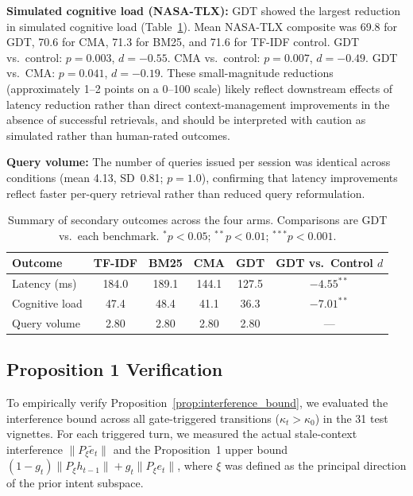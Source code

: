 \documentclass[11pt]{article}
\begin{document}
\textbf{Simulated cognitive load (NASA-TLX):} GDT showed the largest reduction in simulated cognitive load (Table~\ref{tab:secondary}). Mean NASA-TLX composite was 69.8 for GDT, 70.6 for CMA, 71.3 for BM25, and 71.6 for TF-IDF control. GDT vs.\ control: $p = 0.003$, $d = -0.55$. CMA vs.\ control: $p = 0.007$, $d = -0.49$. GDT vs.\ CMA: $p = 0.041$, $d = -0.19$. These small-magnitude reductions (approximately 1--2 points on a 0--100 scale) likely reflect downstream effects of latency reduction rather than direct context-management improvements in the absence of successful retrievals, and should be interpreted with caution as simulated rather than human-rated outcomes.

\textbf{Query volume:} The number of queries issued per session was identical across conditions (mean 4.13, SD~0.81; $p = 1.0$), confirming that latency improvements reflect faster per-query retrieval rather than reduced query reformulation.

\begin{table}[htbp]
\centering
\caption{Summary of secondary outcomes across the four arms. Comparisons are GDT vs.\ each benchmark. $^*p<0.05$; $^{**}p<0.01$; $^{***}p<0.001$.}
\label{tab:secondary}
\begin{tabular}{lccccc}
\toprule
\textbf{Outcome} & \textbf{TF-IDF} & \textbf{BM25} & \textbf{CMA} & \textbf{GDT} & \textbf{GDT vs.\ Control $d$} \\
\midrule
Latency (ms)      & 184.0           & 189.1         & 144.1        & 127.5        & $-4.55^{**}$ \\
Cognitive load    & 47.4            & 48.4          & 41.1         & 36.3         & $-7.01^{**}$ \\
Query volume      & 2.80            & 2.80          & 2.80         & 2.80         & --- \\
\bottomrule
\end{tabular}
\end{table}

\subsection{Proposition 1 Verification}
\label{sec:results_proposition}

To empirically verify Proposition~\ref{prop:interference_bound}, we evaluated the interference bound across all gate-triggered transitions ($\kappa_t > \kappa_0$) in the 31 test vignettes. For each triggered turn, we measured the actual stale-context interference $\|P_\xi \tilde{e}_t\|$ and the Proposition~1 upper bound $(1-g_t)\|P_\xi h_{t-1}\| + g_t\|P_\xi e_t\|$, where $\xi$ was defined as the principal direction of the prior intent subspace.
\end{document}
